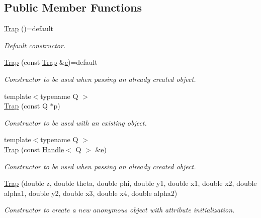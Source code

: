 \subsection*{Public Member Functions}
\begin{DoxyCompactItemize}
\item 
\hyperlink{class_d_d4hep_1_1_geometry_1_1_trap_ad1814caeb6dfd754886b4498d78fcdcd}{Trap} ()=default
\begin{DoxyCompactList}\small\item\em Default constructor. \end{DoxyCompactList}\item 
\hyperlink{class_d_d4hep_1_1_geometry_1_1_trap_a221771330b8027cffaebc559ae7ae230}{Trap} (const \hyperlink{class_d_d4hep_1_1_geometry_1_1_trap}{Trap} \&\hyperlink{_volumes_8cpp_a8a9a1f93e9b09afccaec215310e64142}{e})=default
\begin{DoxyCompactList}\small\item\em Constructor to be used when passing an already created object. \end{DoxyCompactList}\item 
{\footnotesize template$<$typename Q $>$ }\\\hyperlink{class_d_d4hep_1_1_geometry_1_1_trap_a96b503e8c6348aee9c4d68044e147ad3}{Trap} (const Q $\ast$p)
\begin{DoxyCompactList}\small\item\em Constructor to be used with an existing object. \end{DoxyCompactList}\item 
{\footnotesize template$<$typename Q $>$ }\\\hyperlink{class_d_d4hep_1_1_geometry_1_1_trap_ac4047fefb1a80fb3172eb2572177dd19}{Trap} (const \hyperlink{class_d_d4hep_1_1_handle}{Handle}$<$ Q $>$ \&\hyperlink{_volumes_8cpp_a8a9a1f93e9b09afccaec215310e64142}{e})
\begin{DoxyCompactList}\small\item\em Constructor to be used when passing an already created object. \end{DoxyCompactList}\item 
\hyperlink{class_d_d4hep_1_1_geometry_1_1_trap_a94f6d7bb5674a6d9f885fd0a90f0afe7}{Trap} (double z, double theta, double phi, double y1, double x1, double x2, double alpha1, double y2, double x3, double x4, double alpha2)
\begin{DoxyCompactList}\small\item\em Constructor to create a new anonymous object with attribute initialization. \end{DoxyCompactList}\item 

\end{DoxyCompactItemize}
